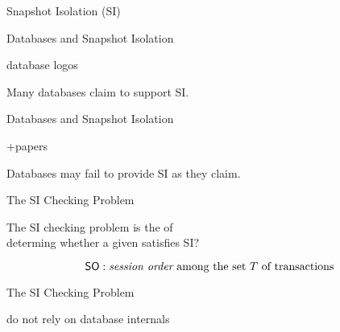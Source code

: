 \begin{frame}{Snapshot Isolation (SI)}
  \begin{center}
    \resizebox{0.60\textwidth}{!}{}
  \end{center}
\end{frame}

\begin{frame}{Databases and Snapshot Isolation}
  \begin{center}
    database logos

    Many databases claim to support SI.
  \end{center}
\end{frame}

\begin{frame}{Databases and Snapshot Isolation}
  \begin{center}
    +papers

    Databases may fail to provide SI as they claim.
  \end{center}
\end{frame}

\begin{frame}{The SI Checking Problem}
  \begin{definition}
    The SI checking problem is the  of \\[5pt]
    determing whether a given  satisfies SI?
  \end{definition}


  \pause
  \vspace{-0.50cm}
  \[
    \textup{\textsf{SO}}: \text{{\it session order} among the set $T$ of transactions}
  \]
\end{frame}

\begin{frame}{The SI Checking Problem}
  \begin{center}
     do not rely on database internals

    \vspace{0.20cm}
    \resizebox{0.55\textwidth}{!}{}
    \vspace{0.20cm}

  \end{center}
\end{frame}

